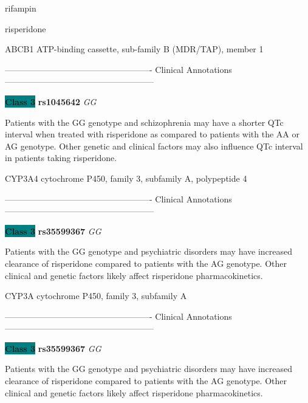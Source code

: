 \documentclass{resume} %
\begin{document}
\begin{rSection}{ rifampin }
\end{rSection}\begin{rSection}{ risperidone }
\item[]

\begin{rSubsection}{ ABCB1 }{ ATP-binding cassette, sub-family B (MDR/TAP), member 1 }{}{}
\item[]

\item[] ---------------------------------------------------- Clinical Annotations -----------------------------------------------------\newline
\item \textbf{\colorbox{teal} {Class 3}} \textbf{ rs1045642 } \textit{ GG }
\item[] Patients with the GG genotype and schizophrenia may have a shorter QTc interval when treated with risperidone as compared to patients with the AA or AG genotype. Other genetic and clinical factors may also influence QTc interval in patients taking risperidone.
\end{rSubsection}\begin{rSubsection}{ CYP3A4 }{ cytochrome P450, family 3, subfamily A, polypeptide 4 }{}{}
\item[]

\item[] ---------------------------------------------------- Clinical Annotations -----------------------------------------------------\newline
\item \textbf{\colorbox{teal} {Class 3}} \textbf{ rs35599367 } \textit{ GG }
\item[] Patients with the GG genotype and psychiatric disorders may have increased clearance of risperidone compared to patients with the AG genotype. Other clinical and genetic factors likely affect risperidone pharmacokinetics.
\end{rSubsection}\begin{rSubsection}{ CYP3A }{ cytochrome P450, family 3, subfamily A }{}{}
\item[]

\item[] ---------------------------------------------------- Clinical Annotations -----------------------------------------------------\newline
\item \textbf{\colorbox{teal} {Class 3}} \textbf{ rs35599367 } \textit{ GG }
\item[] Patients with the GG genotype and psychiatric disorders may have increased clearance of risperidone compared to patients with the AG genotype. Other clinical and genetic factors likely affect risperidone pharmacokinetics.
\end{rSubsection}


\end{rSection}
\end{document}
